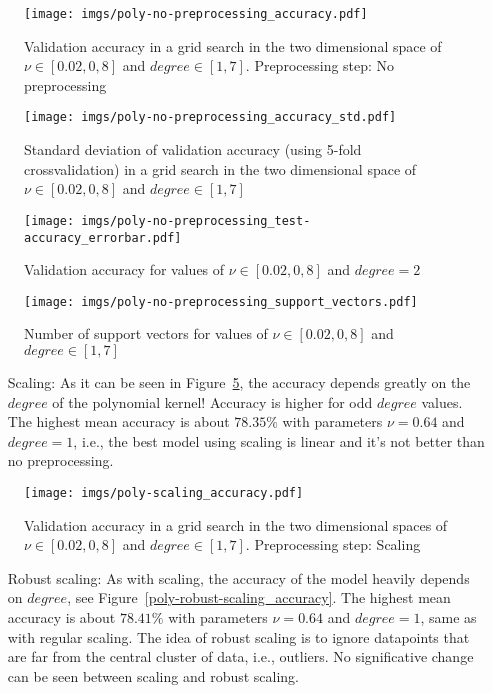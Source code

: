\documentclass[format=acmtog]{acmart}
\begin{document}
\begin{figure}
\centering
\texttt{[image: imgs/poly-no-preprocessing\_accuracy.pdf]}
\caption{Validation accuracy in a grid search in the two dimensional
space of \(\nu \in [0.02,0,8]\) and \(degree \in [1,7]\). Preprocessing
step: No preprocessing \label{poly-no-preprocessing_accuracy}}
\end{figure}

\begin{figure}
\centering
\texttt{[image: imgs/poly-no-preprocessing\_accuracy\_std.pdf]}
\caption{Standard deviation of validation accuracy (using 5-fold
crossvalidation) in a grid search in the two dimensional space of
\(\nu \in [0.02,0,8]\) and \(degree \in [1,7]\)
\label{poly-no-preprocessing_accuracy_std}}
\end{figure}

\begin{figure}
\centering
\texttt{[image: imgs/poly-no-preprocessing\_test-accuracy\_errorbar.pdf]}
\caption{Validation accuracy for values of \(\nu \in [0.02,0,8]\) and
\(degree = 2\) \label{poly-no-preprocessing_test-accuracy_errorbar}}
\end{figure}

\begin{figure}
\centering
\texttt{[image: imgs/poly-no-preprocessing\_support\_vectors.pdf]}
\caption{Number of support vectors for values of \(\nu \in [0.02,0,8]\)
and \(degree \in [1,7]\) \label{poly-no-preprocessing_support_vectors}}
\end{figure}

\begin{itemize}
  \item[Scaling:] As it can be seen in Figure~\ref{poly-scaling_accuracy}, the accuracy
  depends greatly on the $degree$ of the polynomial kernel! Accuracy is higher for odd
  $degree$ values. The highest mean accuracy is about $78.35\%$ with parameters $\nu = 0.64$
  and $degree = 1$, i.e., the best model using scaling is linear and it's not better than
  no preprocessing.
\end{itemize}

\begin{figure}
\centering
\texttt{[image: imgs/poly-scaling\_accuracy.pdf]}
\caption{Validation accuracy in a grid search in the two dimensional
spaces of \(\nu \in [0.02,0,8]\) and \(degree \in [1,7]\). Preprocessing
step: Scaling \label{poly-scaling_accuracy}}
\end{figure}

\begin{itemize}
  \item[Robust scaling:] As with scaling, the accuracy of the model heavily depends on
  $degree$, see Figure~\ref{poly-robust-scaling_accuracy}. The highest mean accuracy is
  about $78.41\%$ with parameters $\nu = 0.64$ and $degree = 1$, same as with regular
  scaling. The idea of robust scaling is to ignore datapoints that are far from the
  central cluster of data, i.e., outliers. No significative change can be seen between
  scaling and robust scaling.
\end{itemize}
\end{document}
